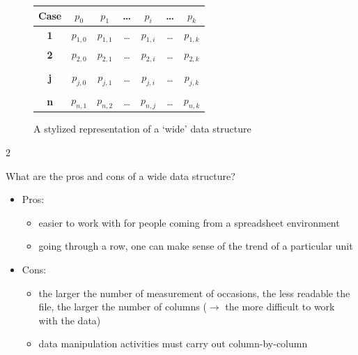 \documentclass[a4paper,11pt]{book}
\newcommand{\question}[1]{%
    \begin{tcolorbox}[colback=comp_c!10,colframe=comp_c,sidebyside align=top,width=\linewidth,before skip=1ex]
        #1
    \end{tcolorbox}
    \switchcolumn%
}
\newcommand{\note}[1]{%
    \begin{tcolorbox}[colback=white!0,colframe=white!10,width=\linewidth,before skip=1ex]
        #1
    \end{tcolorbox}
}
\begin{document}
\begin{figure}[!htbp]
	\centering
	\begin{tabular}{|c|c|c|c|c|c|c|}
		\hline
		\textbf{Case} & \textbf{$p_{0}$} & \textbf{$p_{1}$} & \ldots & \textbf{$p_{i}$} & \ldots & \textbf{$p_{k}$} \\ \hline
		\textbf{1}    & $p_{1,0}$ & $p_{1,1}$ & \ldots & $p_{1,i}$ & \ldots & $p_{1,k}$ \\
		\textbf{2}    & $p_{2,0}$ & $p_{2,1}$ & \ldots & $p_{2,i}$ & \ldots & $p_{2,k}$ \\
                \multicolumn{7}{c}{}\\
		\textbf{j}    & $p_{j,0}$ & $p_{j,1}$ & \ldots & $p_{j,i}$ & \ldots & $p_{j,k}$ \\
                \multicolumn{7}{c}{}\\
		\textbf{n}    & $p_{n,1}$ & $p_{n,2}$ & \ldots & $p_{n,j}$ & \ldots & $p_{n,k}$ \\
		\hline 
	\end{tabular}
	\caption{A stylized representation of a `wide' data structure}
	\label{fig:wide_dataframe}
\end{figure}

\begin{paracol}{2}
	\question{
		\raggedright What are the pros and cons of a wide data structure?
	}
	\note{
		\begin{itemize}
			\item Pros:
			\begin{itemize}
				\item easier to work with for people coming from a spreadsheet environment
				\item going through a row, one can make sense of the trend of a particular unit
			\end{itemize}
			\item Cons:
			\begin{itemize}
				\item the larger the number of measurement of occasions, the less readable the file, the larger the number of columns ($\rightarrow$ the more difficult to work with the data)
				\item data manipulation activities must carry out column-by-column
			\end{itemize}
		\end{itemize}
		}
\end{paracol}
\clearpage
\end{document}
